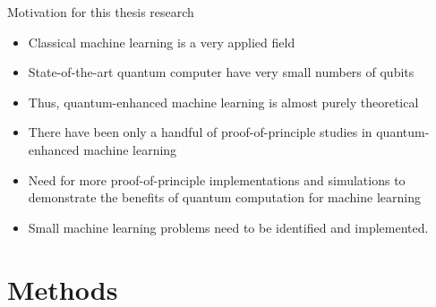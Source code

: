 \documentclass[10pt]{beamer}
\begin{document}
{
\begin{frame}[fragile]{Motivation for this thesis research}

\begin{itemize}
\item Classical machine learning is a very applied field
\item State-of-the-art quantum computer have very small numbers of qubits
\item Thus, quantum-enhanced machine learning is almost purely theoretical
\item There have been only a handful of proof-of-principle studies in quantum-enhanced machine learning
\item Need for more proof-of-principle implementations and simulations to demonstrate the benefits of quantum computation for machine learning
\item Small machine learning problems need to be identified and implemented.
\end{itemize}

\end{frame}
}

\section{Methods}
\end{document}
